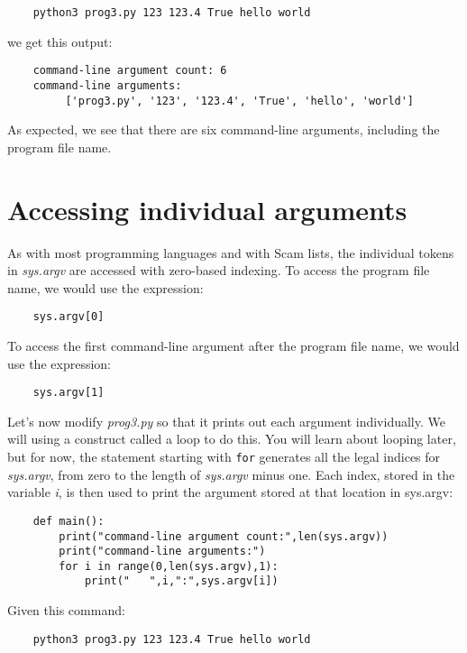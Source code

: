 \begin{verbatim}
    python3 prog3.py 123 123.4 True hello world
\end{verbatim}

we get this output:

\begin{verbatim}
    command-line argument count: 6
    command-line arguments:
         ['prog3.py', '123', '123.4', 'True', 'hello', 'world']
\end{verbatim}

As expected, we see that there are six command-line arguments,
including the program file name.

\section*{Accessing individual arguments}

As with most programming languages and with Scam lists,
the individual tokens in {\it sys.argv} are accessed with
zero-based indexing. To access the program file name, we would
use the expression:

\begin{verbatim}
    sys.argv[0]
\end{verbatim}

To access the first command-line argument after the program
file name, we would use the expression:

\begin{verbatim}
    sys.argv[1]
\end{verbatim}

Let's now modify {\it prog3.py} so that it prints out each argument
individually. We will using a construct called a loop to do this. You
will learn about looping later, but for now, the statement
starting with {\tt for} generates all the legal indices for
{\it sys.argv}, from zero to the length of {\it sys.argv} minus one.
Each index, stored in the variable {\it i}, is then used to print the argument
stored at that location in sys.argv:

\begin{verbatim}
    def main():
        print("command-line argument count:",len(sys.argv))
        print("command-line arguments:")
        for i in range(0,len(sys.argv),1):
            print("   ",i,":",sys.argv[i])
\end{verbatim}
    
Given this command:

\begin{verbatim}
    python3 prog3.py 123 123.4 True hello world
\end{verbatim}


